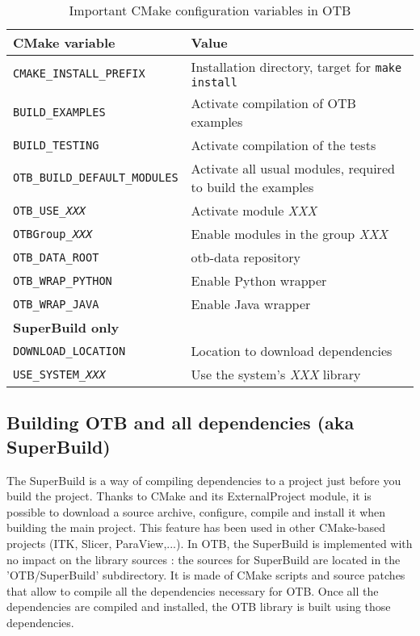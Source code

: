 \begin{center}
\begin{tiny}
\begin{table}[!htbp]
\begin{tabular}{p{}p{}}
\hline
\textbf{CMake variable} & \textbf{Value} \\
\hline
\texttt{CMAKE\_INSTALL\_PREFIX}         & Installation directory, target for \texttt{make install} \\
\texttt{BUILD\_EXAMPLES}                & Activate compilation of OTB examples \\
\texttt{BUILD\_TESTING}                 & Activate compilation of the tests \\
\texttt{OTB\_BUILD\_DEFAULT\_MODULES}   & Activate all usual modules, required to build the examples \\
\texttt{OTB\_USE\_\textit{XXX}}         & Activate module \textit{XXX} \\
\texttt{OTBGroup\_\textit{XXX}}         & Enable modules in the group \textit{XXX} \\
\texttt{OTB\_DATA\_ROOT}                & otb-data repository \\
\texttt{OTB\_WRAP\_PYTHON}              & Enable Python wrapper \\
\texttt{OTB\_WRAP\_JAVA}                & Enable Java wrapper \\

\hline
\multicolumn{2}{l}{\small \textbf{SuperBuild only}} \\ 
\texttt{DOWNLOAD\_LOCATION}             & Location to download dependencies \\
\texttt{USE\_SYSTEM\_\textit{XXX}}      & Use the system's \textit{XXX} library \\

\hline
\end{tabular}
\caption{Important CMake configuration variables in OTB}
\label{tab:installation-cmake-variables}
\end{table}
\end{tiny}
\end{center}

\subsection{Building OTB and all dependencies (aka SuperBuild)}
\label{sec:installation-linux-superbuild}

The SuperBuild is a way of compiling dependencies to a project just before you build the project. Thanks to CMake and
its ExternalProject module, it is possible to download a source archive, configure, compile and install it when building
the main project. This feature has been used in other CMake-based projects (ITK, Slicer, ParaView,...).
In OTB, the SuperBuild is implemented with no impact on the library sources : the sources for SuperBuild are located in
the 'OTB/SuperBuild' subdirectory. It is made of CMake scripts and source patches that allow to compile all the
dependencies necessary for OTB. Once all the dependencies are compiled and installed, the OTB library is built using
those dependencies.

